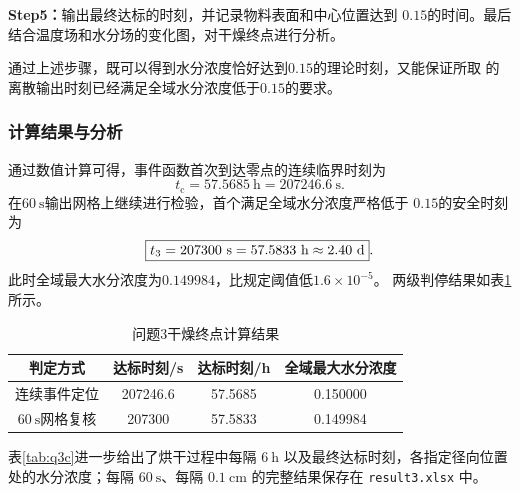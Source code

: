 \documentclass[12pt,a4paper,fontset=none]{ctexart}
\begin{document}
\noindent\textbf{Step5：}输出最终达标的时刻，并记录物料表面和中心位置达到
$0.15$的时间。最后结合温度场和水分场的变化图，对干燥终点进行分析。

通过上述步骤，既可以得到水分浓度恰好达到$0.15$的理论时刻，又能保证所取
的离散输出时刻已经满足全域水分浓度低于$0.15$的要求。

\subsubsection{计算结果与分析}

通过数值计算可得，事件函数首次到达零点的连续临界时刻为
\begin{equation}
t_{\mathrm{c}}=57.5685\ \mathrm{h}
=207246.6\ \mathrm{s}.
\label{eq:q3_critical_result}
\end{equation}
在$60\ \mathrm{s}$输出网格上继续进行检验，首个满足全域水分浓度严格低于
$0.15$的安全时刻为
\begin{equation}
\boxed{t_3=207300\ \mathrm{s}
=57.5833\ \mathrm{h}
\approx2.40\ \mathrm{d}}.
\label{eq:q3_final_result}
\end{equation}
此时全域最大水分浓度为$0.149984$，比规定阈值低$1.6\times10^{-5}$。
两级判停结果如表\ref{tab:q3_results}所示。

\begin{table}[H]
\centering
\caption{问题3干燥终点计算结果}
\label{tab:q3_results}
\begin{tabular}{cccc}
\toprule
判定方式 & 达标时刻/s & 达标时刻/h & 全域最大水分浓度 \\
\midrule
连续事件定位 & 207246.6 & 57.5685 & 0.150000 \\
$60\ \mathrm{s}$网格复核 & 207300 & 57.5833 & 0.149984 \\
\bottomrule
\end{tabular}
\end{table}

表\ref{tab:q3c}进一步给出了烘干过程中每隔 $6\ \mathrm h$ 以及最终达标时刻，各指定径向位置处的水分浓度；每隔 $60\ \mathrm s$、每隔 $0.1\ \mathrm{cm}$ 的完整结果保存在 \texttt{result3.xlsx} 中。
\end{document}
